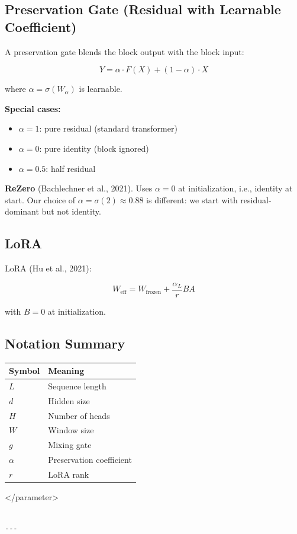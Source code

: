 \subsection{Preservation Gate (Residual with Learnable Coefficient)}

A preservation gate blends the block output with the block input:

\[
Y = \alpha \cdot F(X) + (1 - \alpha) \cdot X
\tag{3.5}
\]

where $\alpha = \sigma(W_\alpha)$ is learnable.

\textbf{Special cases:}
\begin{itemize}
\item $\alpha = 1$: pure residual (standard transformer)
\item $\alpha = 0$: pure identity (block ignored)
\item $\alpha = 0.5$: half residual

\end{itemize}
\textbf{ReZero} (Bachlechner et al., 2021). Uses $\alpha = 0$ at initialization, 
i.e., identity at start. Our choice of $\alpha = \sigma(2) \approx 0.88$ is 
different: we start with residual-dominant but not identity.

\subsection{LoRA}

LoRA (Hu et al., 2021):

\[
W_\text{eff} = W_\text{frozen} + \frac{\alpha_L}{r} BA
\tag{3.6}
\]

with $B = 0$ at initialization.

\subsection{Notation Summary}

\begin{table}[H]
\centering
\small
\begin{tabular}{ll}
\toprule
\textbf{Symbol} & \textbf{Meaning} \\
\midrule
$L$ & Sequence length \\
$d$ & Hidden size \\
$H$ & Number of heads \\
$W$ & Window size \\
$g$ & Mixing gate \\
$\alpha$ & Preservation coefficient \\
$r$ & LoRA rank \\
\bottomrule
\end{tabular}
\end{table}
</parameter>
\begin{lstlisting}

---
\end{lstlisting}